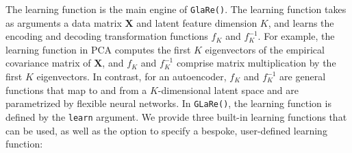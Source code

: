 The learning function is the main engine of \texttt{GlaRe()}.
The learning function takes as arguments a data matrix $\mathbf{X}$ and latent feature dimension $K$, and learns the encoding and decoding transformation functions $f_K$ and $f_K^{-1}$.
For example, the learning function in PCA computes the first $K$ eigenvectors of the empirical covariance matrix of $\mathbf{X}$, and $f_K$ and $f_K^{-1}$ comprise matrix multiplication by the first $K$ eigenvectors.
In contrast, for an autoencoder, $f_K$ and $f_K^{-1}$ are general functions that map to and from a $K$-dimensional latent space and are parametrized by flexible neural networks.
In \texttt{GLaRe()}, the learning function is defined by the \texttt{learn} argument. 
We provide three built-in learning functions that can be used, as well as the option to specify a bespoke, user-defined learning function:
